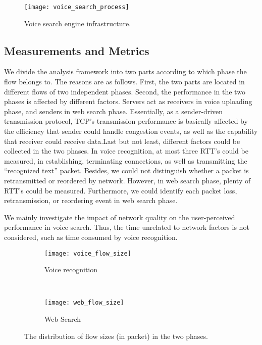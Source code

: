 \begin{figure}[th]
	\centering
	\texttt{[image: voice\_search\_process]}
	\caption{Voice search engine infrastructure.}
	\label{fig:voice_search}
\end{figure}

\subsection{Measurements and Metrics}

We divide the analysis framework into two parts according to which phase the flow belongs to. The reasons are as follows. First, the two parts are located in different flows of two independent phases. Second, the performance in the two phases is affected by different factors. Servers act as receivers in voice uploading phase, and senders in web search phase. Essentially, as a sender-driven transmission protocol, TCP's transmission performance is basically affected by the efficiency that sender could handle congestion events, as well as the capability that receiver could receive data.Last but not least, different factors could be collected in the two phases. In voice recognition, at most three RTT's could be measured, in establishing, terminating connections, as well as transmitting the ``recognized text'' packet. Besides, we could not distinguish whether a packet is retransmitted or reordered by network. However, in web search phase, plenty of RTT's could be measured. Furthermore, we could identify each packet loss, retransmission, or reordering event in web search phase.

We mainly investigate the impact of network quality on the user-perceived performance in voice search. Thus, the time unrelated to network factors is not considered, such as time consumed by voice recognition.

\begin{figure}[th]
\centering
\begin{subfigure}[b]{0.8\linewidth}
	\texttt{[image: voice\_flow\_size]}
\caption{Voice recognition}
\label{fig:voice_flow_size}
\end{subfigure} \\
\begin{subfigure}[b]{0.8\linewidth}
	\texttt{[image: web\_flow\_size]}
\caption{Web Search}
\label{fig:web_flow_size}
\end{subfigure}
\caption{The distribution of flow sizes (in packet) in the two phases.}
\label{fig:flow_size}
\end{figure}

